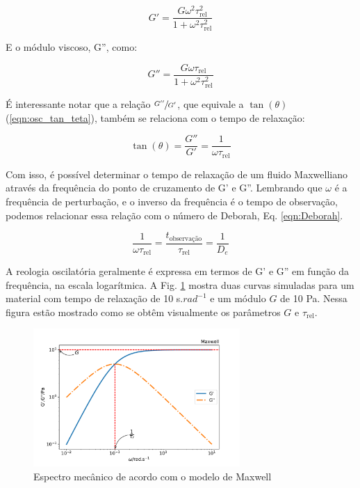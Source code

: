 			\begin{equation}
				G' = \dfrac{ G \omega^2 \tau_{\textrm{rel}}^2   }{  1 + \omega^2 \tau_{\textrm{rel}}^2      }
				\label{eqn:Maxwell_G1_def}
			\end{equation}
			
			E o módulo viscoso, G'', como:
			
			\begin{equation}
				G'' = \dfrac{  G \omega  \tau_{\textrm{rel}}        }{ 1 + \omega^2 \tau_{\textrm{rel}}^2 }
				\label{eqn:Maxwell_G2_def}
			\end{equation}
			
			É interessante notar que a relação \(\sfrac{G''}{G'}\), que equivale a \(\tan(\theta)\) (\ref{eqn:osc_tan_teta}), também se relaciona com o tempo de relaxação:
			
			\begin{equation}
				\tan(\theta) = \dfrac{G''}{G'} = \dfrac{1}{\omega\tau_{\textrm{rel}}}
				\label{eqn:Maxwell_cruzamento}
			\end{equation}
			
			Com isso, é possível determinar o tempo de relaxação de um fluido Maxwelliano através da frequência do ponto de cruzamento de G' e G''. Lembrando que \(\omega\) é a frequência de perturbação, e o inverso da frequência é o tempo de observação, podemos relacionar essa relação com o número de Deborah, Eq. \ref{eqn:Deborah}.
			
			\begin{equation}
				\dfrac{1}{\omega\tau_{\textrm{rel}}} = \dfrac{ t_{\textrm{observação}  }}{ \tau_{\textrm{rel}}  } = \dfrac{1}{D_e}
				\label{eqn:Maxwell_cruzamento_Deborah}
			\end{equation}

			A reologia oscilatória geralmente é expressa em termos de G' e G'' em função da frequência, na escala logarítmica. A Fig. \ref{fig:modelo_maxwell} mostra duas curvas simuladas para um material com tempo de relaxação de 10 s.$rad^{-1}$ e um módulo \(G\) de 10 Pa. Nessa figura estão mostrado como se obtêm visualmente os parâmetros \(G\) e \(\tau_{\mathrm{rel}}\).
			
			\begin{figure}[h]
				\centering
				\includegraphics[width=0.7\textwidth]{./imagens/reologia/modelo_maxwell}
				\caption{Espectro mecânico de acordo com o modelo de Maxwell}
				\label{fig:modelo_maxwell}
			\end{figure}
			
